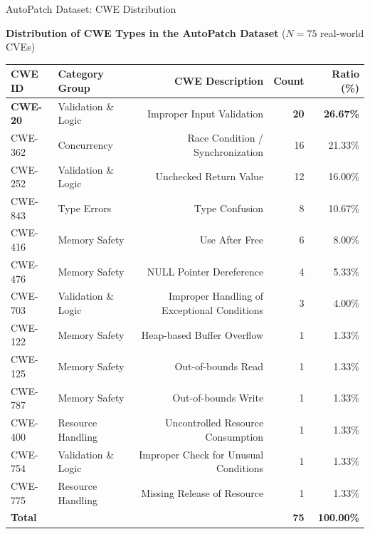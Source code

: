 \documentclass[aspectratio=169,10pt]{beamer}
\begin{document}
\begin{frame}{AutoPatch Dataset: CWE Distribution}

  \begin{center}
    {\small\textbf{Distribution of CWE Types in the AutoPatch Dataset} {\scriptsize($N = 75$ real-world CVEs)}}\\[3pt]
    {\scriptsize
    \renewcommand{\arraystretch}{1.08}
    \setlength{\tabcolsep}{5pt}
    \begin{tabular}{llrrr}
      \toprule
      \textbf{CWE ID} & \textbf{Category Group} & \textbf{CWE Description} & \textbf{Count} & \textbf{Ratio (\%)} \\
      \midrule
      \rowcolor{hit!12}
      \textbf{CWE-20}  & Validation \& Logic & Improper Input Validation & \textbf{20} & \textbf{26.67\%} \\
      CWE-362 & Concurrency        & Race Condition / Synchronization & 16 & 21.33\% \\
      CWE-252 & Validation \& Logic & Unchecked Return Value & 12 & 16.00\% \\
      CWE-843 & Type Errors        & Type Confusion & 8  & 10.67\% \\
      CWE-416 & Memory Safety      & Use After Free & 6  & 8.00\% \\
      CWE-476 & Memory Safety      & NULL Pointer Dereference & 4  & 5.33\% \\
      CWE-703 & Validation \& Logic & Improper Handling of Exceptional Conditions & 3  & 4.00\% \\
      CWE-122 & Memory Safety      & Heap-based Buffer Overflow & 1  & 1.33\% \\
      CWE-125 & Memory Safety      & Out-of-bounds Read & 1  & 1.33\% \\
      CWE-787 & Memory Safety      & Out-of-bounds Write & 1  & 1.33\% \\
      CWE-400 & Resource Handling  & Uncontrolled Resource Consumption & 1  & 1.33\% \\
      CWE-754 & Validation \& Logic & Improper Check for Unusual Conditions & 1  & 1.33\% \\
      CWE-775 & Resource Handling  & Missing Release of Resource & 1  & 1.33\% \\
      \midrule
      \textbf{Total} & & & \textbf{75} & \textbf{100.00\%} \\
      \bottomrule
    \end{tabular}}
  \end{center}


\end{frame}
\end{document}
